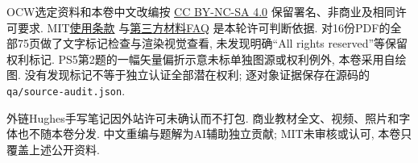 OCW选定资料和本卷中文改编按
\href{https://creativecommons.org/licenses/by-nc-sa/4.0/}{CC BY-NC-SA 4.0}
保留署名、非商业及相同许可要求.
MIT\href{https://ocw.mit.edu/pages/privacy-and-terms-of-use/}{使用条款}
与\href{https://mitocw.zendesk.com/hc/en-us/articles/4414756181403-How-is-all-rights-reserved-content-different-from-the-rest-of-OCW-content}{第三方材料FAQ}
是本轮许可判断依据.
对16份PDF的全部75页做了文字标记检查与渲染视觉查看,
未发现明确``All rights reserved''等保留权利标记.
PS5第2题的一幅矢量偏折示意未标单独图源或权利例外, 本卷采用自绘图.
没有发现标记不等于独立认证全部潜在权利; 逐对象证据保存在源码的\texttt{qa/source-audit.json}.

外链Hughes手写笔记因外站许可未确认而不打包.
商业教材全文、视频、照片和字体也不随本卷分发.
中文重编与题解为AI辅助独立贡献; MIT未审核或认可, 本卷只覆盖上述公开资料.

